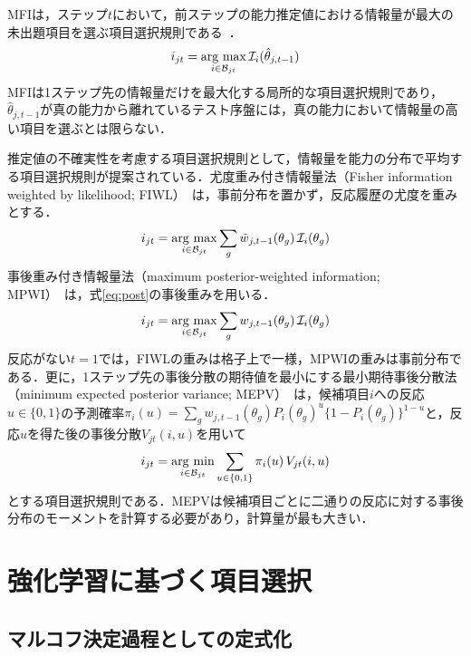 \documentclass[paper]{ieicej}
\begin{document}
MFIは，ステップ$t$において，前ステップの能力推定値における情報量が最大の未出題項目を選ぶ項目選択規則である~\cite{Lord1980}．
\begin{equation}
 i_{jt}=\mathop{\rm arg~max}_{i\in\mathcal{B}_{jt}}\mathcal{I}_i(\hat\theta_{j,t-1})
 \label{eq:mfi}
\end{equation}
MFIは1ステップ先の情報量だけを最大化する局所的な項目選択規則であり，$\hat\theta_{j,t-1}$が真の能力から離れているテスト序盤には，真の能力において情報量の高い項目を選ぶとは限らない．

推定値の不確実性を考慮する項目選択規則として，情報量を能力の分布で平均する項目選択規則が提案されている．尤度重み付き情報量法（Fisher information weighted by likelihood; FIWL）~\cite{VeerkampBerger1997}は，事前分布を置かず，反応履歴の尤度を重みとする．
\begin{equation}
 i_{jt}=\mathop{\rm arg~max}_{i\in\mathcal{B}_{jt}}\sum_{g}\tilde w_{j,t-1}(\theta_g)\,\mathcal{I}_i(\theta_g)
 \label{eq:fiwl}
\end{equation}
事後重み付き情報量法（maximum posterior-weighted information; MPWI）~\cite{vanderLinden1998}は，式\eqref{eq:post}の事後重みを用いる．
\begin{equation}
 i_{jt}=\mathop{\rm arg~max}_{i\in\mathcal{B}_{jt}}\sum_{g}w_{j,t-1}(\theta_g)\,\mathcal{I}_i(\theta_g)
 \label{eq:mpwi}
\end{equation}
反応がない$t=1$では，FIWLの重みは格子上で一様，MPWIの重みは事前分布である．更に，1ステップ先の事後分散の期待値を最小にする最小期待事後分散法（minimum expected posterior variance; MEPV）~\cite{Owen1975,vanderLinden1998}は，候補項目$i$への反応$u\in\{0,1\}$の予測確率$\pi_{i}(u)=\sum_gw_{j,t-1}(\theta_g)P_i(\theta_g)^u\{1-P_i(\theta_g)\}^{1-u}$と，反応$u$を得た後の事後分散$V_{jt}(i,u)$を用いて
\begin{equation}
 i_{jt}=\mathop{\rm arg~min}_{i\in\mathcal{B}_{jt}}\sum_{u\in\{0,1\}}\pi_i(u)\,V_{jt}(i,u)
 \label{eq:mepv}
\end{equation}
とする項目選択規則である．MEPVは候補項目ごとに二通りの反応に対する事後分布のモーメントを計算する必要があり，計算量が最も大きい．

\section{強化学習に基づく項目選択}\label{sec:rl}

\subsection{マルコフ決定過程としての定式化}\label{sec:mdp}
\end{document}
